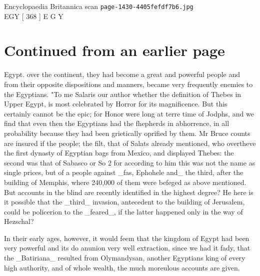 \documentclass{article}
\begin{document}
\begin{center}
{\Large Encyclopaedia Britannica scan \texttt{page-1430-4405fefdf7b6.jpg}}\\[0.5em]
EGY [ 368 ] E G Y
\end{center}
\section*{Continued from an earlier page}
Egypt. over the continent, they had become a great and powerful people and from their opposite dispositions and manners, became very frequently enemies to the Egyptians. "To me Salaris our author whether the definition of Thebes in Upper Egypt, is most celebrated by Horror for its magnificence. But this certainly cannot be the epic; for Honor were long at terre time of Jodphs, and we find that even then the Egyptians had the fhepherds in abhorrence, in all probability because they had been grietically oprified by them. Mr Bruce counts are insured if the people; the filt, that of Salats already mentioned, who overtheve the first dynasty of Egyptian bags from Mexico, and displayed Thebes: the second was that of Sabasco or So 2 for according to him this was not the name as single prices, but of a people against \_fas, Ephohele and\_ the third, after the building of Memphis, where 240,000 of them were befeged as above mentioned. But accounts in the blind are recently identified in the highest degree? He here is it possible that the \_third\_ invasion, antecedent to the building of Jerusalem, could be policerion to the \_feared\_, if the latter happened only in the way of Hezschal?

In their early ages, however, it would feem that the kingdom of Egypt had been very powerful and its do anunion very well extraction, since we had it fady, that the \_Batiriana\_ resulted from Olymandysan, another Egyptians king of every high authority, and of whole wealth, the much moreulous accounts are given.
\end{document}
